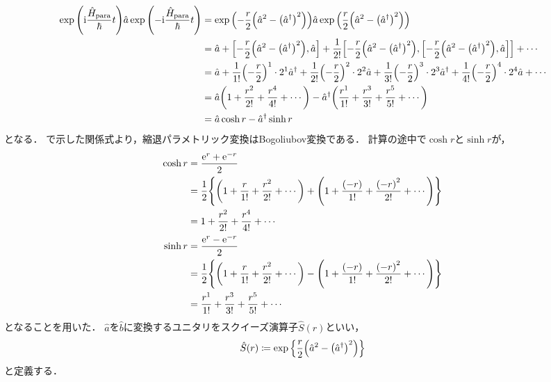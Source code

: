 \documentclass{report}
\begin{document}
    \begin{align}
      \exp\qty(\mathrm{i}\frac{\hat{H}_{\mathrm{para}}}{\hbar}t)\hat{a}\exp\qty(-\mathrm{i}\frac{\hat{H}_{\mathrm{para}}}{\hbar}t) &= \exp\qty(-\frac{r}{2}\qty(\hat{a}^2 - \qty(\hat{a}^{\dag})^2))\hat{a}\exp\qty(\frac{r}{2}\qty(\hat{a}^2 - \qty(\hat{a}^{\dag})^2)) \\ 
      &= \hat{a} + \qty[-\frac{r}{2}\qty(\hat{a}^2 - \qty(\hat{a}^{\dag})^2), \hat{a}] + \frac{1}{2!}\qty[-\frac{r}{2}\qty(\hat{a}^2 - \qty(\hat{a}^{\dag})^2), \qty[-\frac{r}{2}\qty(\hat{a}^2 - \qty(\hat{a}^{\dag})^2), \hat{a}]] + \cdots \\ 
      &= \hat{a} + \frac{1}{1!}\qty(-\frac{r}{2})^1\cdot 2^1\hat{a}^{\dag} + \frac{1}{2!}\qty(-\frac{r}{2})^2\cdot 2^2\hat{a} + \frac{1}{3!}\qty(-\frac{r}{2})^3\cdot 2^3\hat{a}^{\dag} + \frac{1}{4!}\qty(-\frac{r}{2})^4\cdot 2^4\hat{a} + \cdots \\ 
      &= \hat{a}\qty(1 + \frac{r^2}{2!} + \frac{r^4}{4!} + \cdots) - \hat{a}^{\dag}\qty(\frac{r^1}{1!} + \frac{r^3}{3!} + \frac{r^5}{5!} + \cdots) \\ 
      &= \hat{a}\cosh r - \hat{a}^{\dag}\sinh r
    \end{align}
    となる．
    で示した関係式より，縮退パラメトリック変換はBogoliubov変換である．
    計算の途中で$\cosh r$と$\sinh r$が，
    \begin{align}
      \cosh r &= \frac{\mathrm{e}^r + \mathrm{e}^{-r}}{2} \\ 
      &= \frac{1}{2}\qty{\qty(1 + \frac{r}{1!} + \frac{r^2}{2!} + \cdots) + \qty(1 + \frac{\qty(-r)}{1!} + \frac{\qty(-r)^2}{2!} + \cdots)} \\ 
      &= 1 + \frac{r^2}{2!} + \frac{r^4}{4!} + \cdots \\ 
      \sinh r &= \frac{\mathrm{e}^r - \mathrm{e}^{-r}}{2} \\ 
      &= \frac{1}{2}\qty{\qty(1 + \frac{r}{1!} + \frac{r^2}{2!} + \cdots) - \qty(1 + \frac{\qty(-r)}{1!} + \frac{\qty(-r)^2}{2!} + \cdots)} \\ 
      &= \frac{r^1}{1!} + \frac{r^3}{3!} + \frac{r^5}{5!} + \cdots \\
    \end{align}
    となることを用いた．
    $\hat{a}$を$\hat{b}$に変換するユニタリをスクイーズ演算子$\hat{S}(r)$といい，
    \begin{align}
      \hat{S}(r) \coloneqq \exp\qty{\frac{r}{2}\qty(\hat{a}^2 - \qty(\hat{a}^{\dag})^2)}
    \end{align}
    と定義する．
\end{document}
